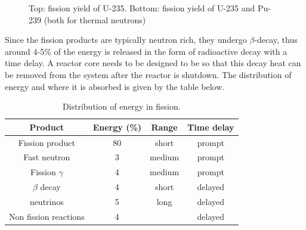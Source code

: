\begin{figure}[ht!]
\protect {}\protect
\caption{\label{fig:fissyield} \footnotesize{Top: fission yield of U-235. Bottom: fission yield of U-235 and Pu-239 (both for thermal neutrons)}}
\end{figure}

Since the fission products are typically neutron rich, they undergo $\beta$-decay, thus around 4-5\% of the energy is released in the form of radioactive decay with a time delay. A reactor core needs to be designed to be so that this decay heat can be removed from the system after the reactor is shutdown. The distribution of energy and where it is absorbed is given by the table below.

\begin{table}\caption{Distribution of energy in fission.}
\begin{tabular}{c | c | c | c}
Product & Energy (\%) & Range & Time delay \\
\hline
Fission product & 80 & short & prompt \\
Fast neutron & 3 & medium & prompt \\
Fission $\gamma$ & 4 & medium & prompt \\
$\beta$ decay & 4 & short & delayed \\
neutrinos & 5 & long & delayed \\
Non fission reactions & 4 &  & delayed 
\end{tabular}
\end{table}

